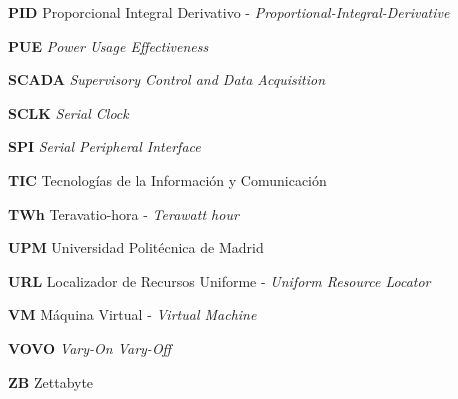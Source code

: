 \noindent\textbf{PID} Proporcional Integral Derivativo - \textit{Proportional-Integral-Derivative} 

\noindent\textbf{PUE} \textit{Power Usage Effectiveness} 

\noindent\textbf{SCADA} \textit{Supervisory Control and Data Acquisition} 

\noindent\textbf{SCLK} \textit{Serial Clock} 

\noindent\textbf{SPI} \textit{Serial Peripheral Interface}

\noindent\textbf{TIC} Tecnologías de la Información y Comunicación

\noindent\textbf{TWh} Teravatio-hora - \textit{Terawatt hour}

\noindent\textbf{UPM} Universidad Politécnica de Madrid 

\noindent\textbf{URL} Localizador de Recursos Uniforme  - \textit{Uniform Resource Locator}

\noindent\textbf{VM} Máquina Virtual - \textit{Virtual Machine}

\noindent\textbf{VOVO} \textit{Vary-On Vary-Off}

\noindent\textbf{ZB} {Zettabyte}